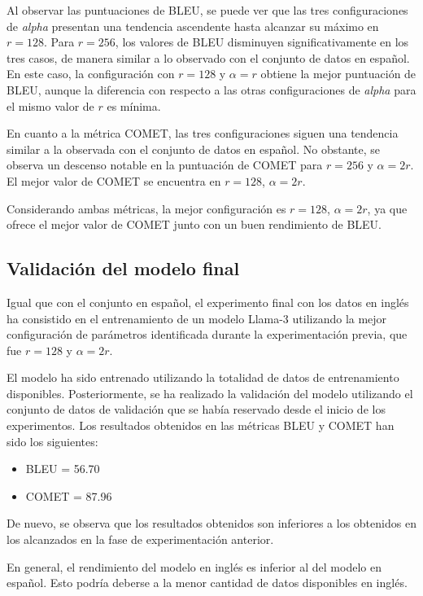 \documentclass[11pt,spanish,listoffigures,listoftables]{tfgetsinf}
\begin{document}
Al observar las puntuaciones de BLEU, se puede ver que las tres configuraciones de \textit{alpha} presentan una tendencia ascendente hasta alcanzar su máximo en $r = 128$. Para $r = 256$, los valores de BLEU disminuyen significativamente en los tres casos, de manera similar a lo observado con el conjunto de datos en español. En este caso, la configuración con $r = 128$ y $\alpha = r$ obtiene la mejor puntuación de BLEU, aunque la diferencia con respecto a las otras configuraciones de \textit{alpha} para el mismo valor de $r$ es mínima.

En cuanto a la métrica COMET, las tres configuraciones siguen una tendencia similar a la observada con el conjunto de datos en español. No obstante, se observa un descenso notable en la puntuación de COMET para $r = 256$ y $\alpha = 2r$. El mejor valor de COMET se encuentra en $r = 128$, $\alpha = 2r$.

Considerando ambas métricas, la mejor configuración es $r = 128$, $\alpha = 2r$, ya que ofrece el mejor valor de COMET junto con un buen rendimiento de BLEU.

\subsection{Validación del modelo final}

Igual que con el conjunto en español, el experimento final con los datos en inglés ha consistido en el entrenamiento de un modelo Llama-3 utilizando la mejor configuración de parámetros identificada durante la experimentación previa, que fue $r = 128$ y $\alpha = 2r$.

El modelo ha sido entrenado utilizando la totalidad de datos de entrenamiento disponibles. Posteriormente, se ha realizado la validación del modelo utilizando el conjunto de datos de validación que se había reservado desde el inicio de los experimentos. Los resultados obtenidos en las métricas BLEU y COMET han sido los siguientes:

\begin{itemize}
	\item BLEU = 56.70
	\item COMET = 87.96
\end{itemize}

De nuevo, se observa que los resultados obtenidos son inferiores a los obtenidos en los alcanzados en la fase de experimentación anterior.

En general, el rendimiento del modelo en inglés es inferior al del modelo en español. Esto podría deberse a la menor cantidad de datos disponibles en inglés.
\end{document}
